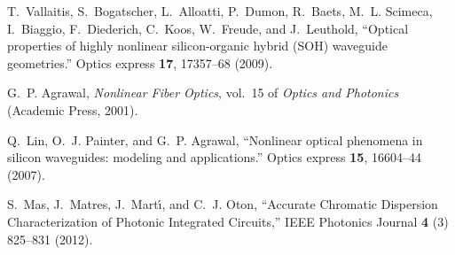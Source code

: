 \documentclass[10pt,letterpaper]{article}
\begin{document}
\begin{thebibliography}{10}
T.~Vallaitis, S.~Bogatscher, L.~Alloatti, P.~Dumon, R.~Baets, M.~L. Scimeca,
  I.~Biaggio, F.~Diederich, C.~Koos, W.~Freude, and J.~Leuthold,
  \enquote{{Optical properties of highly nonlinear silicon-organic hybrid (SOH)
  waveguide geometries.}} Optics express \textbf{17}, 17357--68 (2009).

G.~P. Agrawal, \emph{{Nonlinear Fiber Optics}}, vol.~15 of \emph{Optics and
  Photonics} (Academic Press, 2001).

Q.~Lin, O.~J. Painter, and G.~P. Agrawal, \enquote{{Nonlinear optical phenomena
  in silicon waveguides: modeling and applications.}} Optics express
  \textbf{15}, 16604--44 (2007).

S.~Mas, J.~Matres, J.~Mart\'{\i}, and C.~J. Oton, \enquote{{Accurate Chromatic
  Dispersion Characterization of Photonic Integrated Circuits},} IEEE Photonics
  Journal \textbf{4} (3) 825--831 (2012).
\end{thebibliography}
\end{document}

